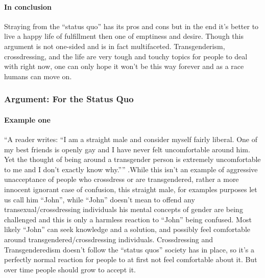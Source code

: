 \paragraph{In conclusion}
Straying from the ``status quo'' has its pros and cons but in the end it's
better to live a happy life of fulfillment then one of emptiness and desire.
Though this argument is not one-sided and is in fact multifaceted.
Transgenderism, crossdressing, and the life are very tough and touchy topics
for people to deal with right now, one can only hope it won't be this way
forever and as a race humans can move on.
\par

\subsubsection{Argument: For the Status Quo}

\paragraph{Example one}
``A reader writes: ``I am a straight male and consider myself fairly liberal.
One of my best friends is openly gay and I have never felt uncomfortable around
him. Yet the thought of being around a transgender person is extremely
uncomfortable to me and I don’t exactly know why.'''' \cite[p.~1]{WDTMU} .While
this isn't an example of aggressive unacceptance of people who crossdress or are
transgendered, rather a more innocent ignorant case of confusion, this straight
male, for examples purposes let us call him ``John'', while ``John'' doesn't
mean to offend any transexual/crossdressing individuals his mental concepts of
gender are being challenged and this is only a harmless reaction to ``John''
being confused. Most likely ``John'' can seek knowledge and a solution, and
possibly feel comfortable around transgendered/crossdressing individuals.
Crossdressing and Transgenderedism doesn't follow the ``status quos'' society
has in place, so it's a perfectly normal reaction for people to at first not
feel comfortable about it. But over time people should grow to accept it.
\par

